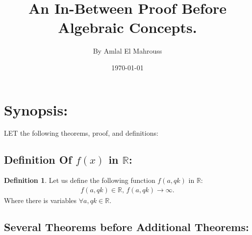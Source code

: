 \documentclass[10pt]{article}
\title{%
	\vspace{-1.5em}%
	\large\textbf{An In-Between Proof Before Algebraic Concepts.}%
}
\author{By Amlal El Mahrouss}
\date{\today}
\theoremstyle{plain}
\theoremstyle{definition}
\newtheorem{definition}[theorem]{Definition}
\theoremstyle{remark}
\begin{document}

\maketitle
\tableofcontents
\newpage

\section{Synopsis:}

\lettrine[lines=1, lhang=0.1, loversize=0.2]{L}ET the following theorems, proof, and definitions:

\subsection{Definition Of $f(x)$ in $\mathbb{R}$:}

\begin{definition}
	Let us define the following function $f(a, qk)$ in $\mathbb{R}$:
	\begin{align*}
		f(a, qk) \in \mathbb{R}, \, f(a, qk) \to \infty.
	\end{align*}
	Where there is variables $\forall a, qk \in \mathbb{R}$.
\end{definition}

\subsection{Several Theorems before Additional Theorems:}
\end{document}
